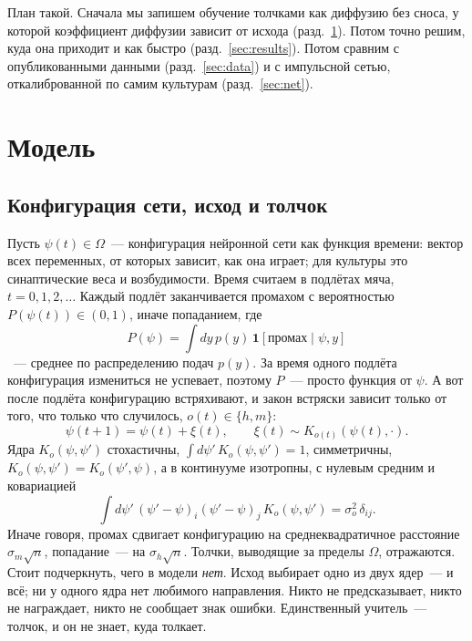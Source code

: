 \documentclass[pre,twocolumn,superscriptaddress,showpacs=false,amsmath,amssymb,nofootinbib]{revtex4-2}
\begin{document}
План такой. Сначала мы запишем обучение толчками как диффузию без сноса, у которой коэффициент диффузии зависит от исхода (разд.~\ref{sec:model}). Потом точно решим, куда она приходит и как быстро (разд.~\ref{sec:results}). Потом сравним с опубликованными данными (разд.~\ref{sec:data}) и с импульсной сетью, откалиброванной по самим культурам (разд.~\ref{sec:net}).

\section{Модель}\label{sec:model}

\subsection{Конфигурация сети, исход и толчок}
Пусть $\psi(t)\in\Omega$~--- конфигурация нейронной сети как функция времени: вектор всех переменных, от которых зависит, как она играет; для культуры это синаптические веса и возбудимости. Время считаем в подлётах мяча, $t=0,1,2,\dots$ Каждый подлёт заканчивается промахом с вероятностью $P(\psi(t))\in(0,1)$, иначе попаданием, где
\begin{equation}
P(\psi)=\int dy\,p(y)\,\mathbf{1}[\text{промах}\mid\psi,y]
\label{eq:P}
\end{equation}
~--- среднее по распределению подач $p(y)$. За время одного подлёта конфигурация измениться не успевает, поэтому $P$~--- просто функция от $\psi$. А вот после подлёта конфигурацию встряхивают, и закон встряски зависит только от того, что только что случилось, $o(t)\in\{h,m\}$:
\begin{equation}
\psi(t+1)=\psi(t)+\xi(t),\qquad \xi(t)\sim K_{o(t)}(\psi(t),\cdot).
\label{eq:kick}
\end{equation}
Ядра $K_o(\psi,\psi')$ стохастичны, $\int d\psi'\,K_o(\psi,\psi')=1$, симметричны, $K_o(\psi,\psi')=K_o(\psi',\psi)$, а в континууме изотропны, с нулевым средним и ковариацией
\begin{equation}
\int d\psi'\,(\psi'-\psi)_i(\psi'-\psi)_j\,K_o(\psi,\psi')=\sigma_o^2\,\delta_{ij}.
\label{eq:moments}
\end{equation}
Иначе говоря, промах сдвигает конфигурацию на среднеквадратичное расстояние $\sigma_m\sqrt n$, попадание~--- на $\sigma_h\sqrt n$. Толчки, выводящие за пределы $\Omega$, отражаются. Стоит подчеркнуть, чего в модели \emph{нет}. Исход выбирает одно из двух ядер~--- и всё; ни у одного ядра нет любимого направления. Никто не предсказывает, никто не награждает, никто не сообщает знак ошибки. Единственный учитель~--- толчок, и он не знает, куда толкает.
\end{document}
